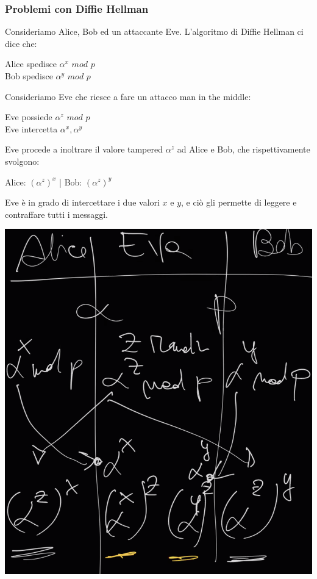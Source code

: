 \documentclass[11pt, oneside]{article}   	%
\begin{document}
\subsubsection*{Problemi con Diffie Hellman}
Consideriamo Alice, Bob ed un attaccante Eve. L'algoritmo di Diffie Hellman ci dice che:
\begin{center}
Alice spedisce $\alpha^x$ $mod$ $p$\\
Bob spedisce $\alpha^y$ $mod$ $p$\\
 \end{center}
 Consideriamo Eve che riesce a fare un attacco man in the middle:
 \begin{center}
 Eve possiede $\alpha^z$ $mod$ $p$\\
 Eve intercetta $\alpha^x, \alpha^y$
 \end{center}
 Eve procede a inoltrare il valore tampered $\alpha^z$ ad Alice e Bob, che rispettivamente svolgono:
 \begin{center}
 Alice: $(\alpha^z)^x$ | Bob: $(\alpha^z)^y$
 \end{center}
 Eve è in grado di intercettare i due valori $x$ e $y$, e ciò gli permette di leggere e contraffare tutti i messaggi.
\begin{center}
\includegraphics[scale= 0.5]{ld1}
\end{center}
\end{document}
